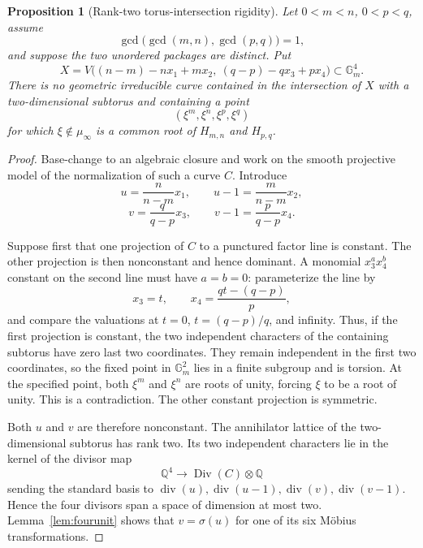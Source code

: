 \documentclass[11pt]{article}
\numberwithin{equation}{section}
\newtheorem{proposition}[theorem]{Proposition}
\theoremstyle{definition}
\newcommand{\Q}{\mathbb Q}
\begin{document}
\begin{proposition}[Rank-two torus-intersection rigidity]
\label{prop:ranktworigidity}
Let \(0<m<n\), \(0<p<q\), assume
\[
 \gcd\bigl(\gcd(m,n),\gcd(p,q)\bigr)=1,
\]
and suppose the two unordered packages are distinct.  Put
\[
 X=V\bigl((n-m)-nx_1+mx_2,\ (q-p)-qx_3+px_4\bigr)
 \subset\mathbb G_m^4.
\]
There is no geometric irreducible curve contained in the intersection of
\(X\) with a two-dimensional subtorus and containing a point
\[
 (\xi^m,\xi^n,\xi^p,\xi^q)
\]
for which \(\xi\notin\mu_\infty\) is a common root of
\(H_{m,n}\) and \(H_{p,q}\).
\end{proposition}

\begin{proof}
Base-change to an algebraic closure and work on the smooth projective model
of the normalization of such a curve \(C\).  Introduce
\[
 u=\frac{n}{n-m}x_1,
 \qquad u-1=\frac{m}{n-m}x_2,
\]
\[
 v=\frac{q}{q-p}x_3,
 \qquad v-1=\frac{p}{q-p}x_4.
\]

Suppose first that one projection of \(C\) to a punctured factor line is
constant.  The other projection is then nonconstant and hence dominant.  A
monomial \(x_3^a x_4^b\) constant on the second line must have
\(a=b=0\): parameterize the line by
\[
 x_3=t,
 \qquad
 x_4=\frac{qt-(q-p)}p,
\]
and compare the valuations at \(t=0\), \(t=(q-p)/q\), and infinity.
Thus, if the first projection is constant, the two independent characters
of the containing subtorus have zero last two coordinates.  They remain
independent in the first two coordinates, so the fixed point in
\(\mathbb G_m^2\) lies in a finite subgroup and is torsion.  At the
specified point, both \(\xi^m\) and \(\xi^n\) are roots of unity, forcing
\(\xi\) to be a root of unity.  This is a contradiction.  The other
constant projection is symmetric.

Both \(u\) and \(v\) are therefore nonconstant.  The annihilator lattice
of the two-dimensional subtorus has rank two.  Its two independent
characters lie in the kernel of the divisor map
\[
 \Q^4\longrightarrow\operatorname{Div}(C)\otimes\Q
\]
sending the standard basis to
\(\operatorname{div}(u),\operatorname{div}(u-1),
\operatorname{div}(v),\operatorname{div}(v-1)\).  Hence the four divisors
span a space of dimension at most two.  Lemma~\ref{lem:fourunit} shows that
\(v=\sigma(u)\) for one of its six Möbius transformations.


\end{proof}
\end{document}
